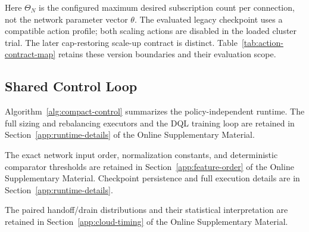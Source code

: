 Here $\Theta_N$ is the configured maximum desired subscription count per
connection, not the network parameter vector $\theta$.
The evaluated legacy checkpoint uses a compatible action profile; both
scaling actions are disabled in the loaded cluster trial. The later
cap-restoring scale-up contract is distinct. Table~\ref{tab:action-contract-map}
retains these version boundaries and their evaluation scope.

\subsection{Shared Control Loop}
Algorithm~\ref{alg:compact-control} summarizes the policy-independent runtime.
The full sizing and rebalancing executors and the DQL training loop are
retained in Section~\ref{app:runtime-details} of the Online Supplementary Material.

\begin{algorithm}[!htbp]
\small
\caption{Probe-Guided Selection and Guarded Execution}
\label{alg:compact-control}
\end{algorithm}

The exact network input order, normalization constants, and deterministic
comparator thresholds are retained in Section~\ref{app:feature-order} of the
Online Supplementary Material. Checkpoint persistence and full execution
details are in Section~\ref{app:runtime-details}.

The paired handoff/drain distributions and their statistical interpretation
are retained in Section~\ref{app:cloud-timing} of the Online Supplementary Material.

